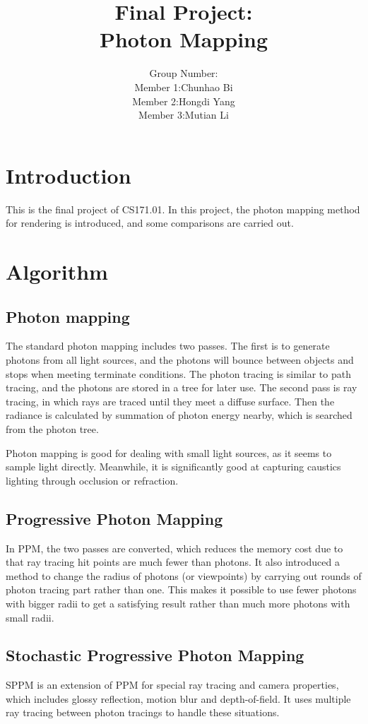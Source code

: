 \documentclass[acmtog]{acmart}
\title{Final Project:\\ {Photon Mapping}}
\author{
Group Number:\quad 5 \\
Member 1:\quad Chunhao Bi\\
Member 2:\quad Hongdi Yang\\
Member 3:\quad Mutian Li
}
\begin{document}
\maketitle

\vspace*{2 ex}

\section{Introduction}
	This is the final project of CS171.01. 
	In this project, the photon mapping method for rendering is introduced, and some comparisons are carried out.
\section{Algorithm}
	\subsection{Photon mapping}
		The standard photon mapping includes two passes. 
		The first is to generate photons from all light sources, and the photons will bounce between objects and stops when meeting terminate conditions.
		The photon tracing is similar to path tracing, and the photons are stored in a tree for later use.
		The second pass is ray tracing, in which rays are traced until they meet a diffuse surface. 
		Then the radiance is calculated by summation of photon energy nearby, which is searched from the photon tree.

		Photon mapping is good for dealing with small light sources, as it seems to sample light directly.
		Meanwhile, it is significantly good at capturing caustics lighting through occlusion or refraction.

	\subsection{Progressive Photon Mapping}
		In PPM, the two passes are converted, which reduces the memory cost due to that ray tracing hit points are much fewer than photons.
		It also introduced a method to change the radius of photons (or viewpoints) by carrying out rounds of photon tracing part rather than one.
		This makes it possible to use fewer photons with bigger radii to get a satisfying result rather than much more photons with small radii.

	\subsection{Stochastic Progressive Photon Mapping}
		SPPM is an extension of PPM for special ray tracing and camera properties, 
		which includes glossy reflection, motion blur and depth-of-field. 
		It uses multiple ray tracing between photon tracings to handle these situations.
\end{document}
